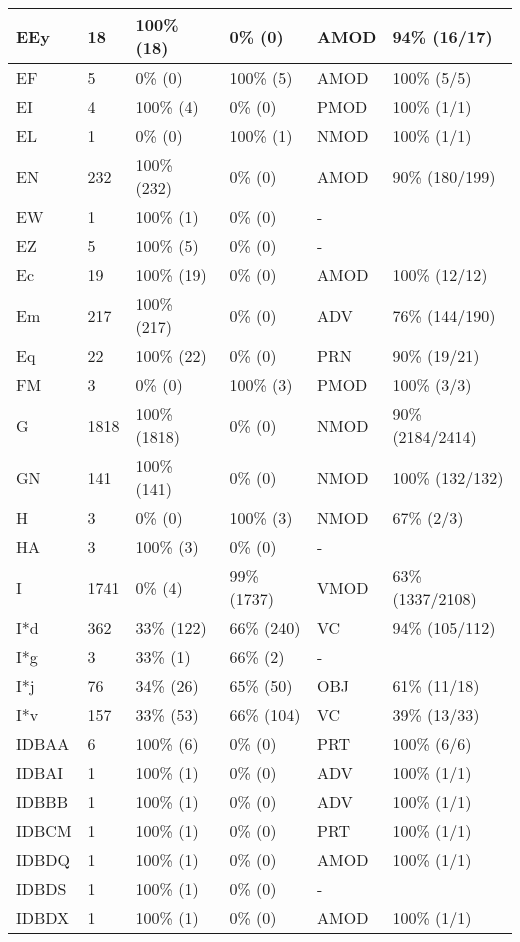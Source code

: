 \begin{figure*}
\begin{tabular}{|l|l|l|l||l|l|}
\hline
 EEy & 18 & 100\% (18) & 0\% (0) & AMOD & 94\% (16/17) \\ 
\hline
 EF & 5 & 0\% (0) & 100\% (5) & AMOD & 100\% (5/5) \\ 
\hline
 EI & 4 & 100\% (4) & 0\% (0) & PMOD & 100\% (1/1) \\ 
\hline
 EL & 1 & 0\% (0) & 100\% (1) & NMOD & 100\% (1/1) \\ 
\hline
 EN & 232 & 100\% (232) & 0\% (0) & AMOD & 90\% (180/199) \\ 
\hline
 EW & 1 & 100\% (1) & 0\% (0) & - &  \\ 
\hline
 EZ & 5 & 100\% (5) & 0\% (0) & - &  \\ 
\hline
 Ec & 19 & 100\% (19) & 0\% (0) & AMOD & 100\% (12/12) \\ 
\hline
 Em & 217 & 100\% (217) & 0\% (0) & ADV & 76\% (144/190) \\ 
\hline
 Eq & 22 & 100\% (22) & 0\% (0) & PRN & 90\% (19/21) \\ 
\hline
 FM & 3 & 0\% (0) & 100\% (3) & PMOD & 100\% (3/3) \\ 
\hline
 G & 1818 & 100\% (1818) & 0\% (0) & NMOD & 90\% (2184/2414) \\ 
\hline
 GN & 141 & 100\% (141) & 0\% (0) & NMOD & 100\% (132/132) \\ 
\hline
 H & 3 & 0\% (0) & 100\% (3) & NMOD & 67\% (2/3) \\ 
\hline
 HA & 3 & 100\% (3) & 0\% (0) & - &  \\ 
\hline
 I & 1741 & 0\% (4) & 99\% (1737) & VMOD & 63\% (1337/2108) \\ 
\hline
 I*d & 362 & 33\% (122) & 66\% (240) & VC & 94\% (105/112) \\ 
\hline
 I*g & 3 & 33\% (1) & 66\% (2) & - &  \\ 
\hline
 I*j & 76 & 34\% (26) & 65\% (50) & OBJ & 61\% (11/18) \\ 
\hline
 I*v & 157 & 33\% (53) & 66\% (104) & VC & 39\% (13/33) \\ 
\hline
 IDBAA & 6 & 100\% (6) & 0\% (0) & PRT & 100\% (6/6) \\ 
\hline
 IDBAI & 1 & 100\% (1) & 0\% (0) & ADV & 100\% (1/1) \\ 
\hline
 IDBBB & 1 & 100\% (1) & 0\% (0) & ADV & 100\% (1/1) \\ 
\hline
 IDBCM & 1 & 100\% (1) & 0\% (0) & PRT & 100\% (1/1) \\ 
\hline
 IDBDQ & 1 & 100\% (1) & 0\% (0) & AMOD & 100\% (1/1) \\ 
\hline
 IDBDS & 1 & 100\% (1) & 0\% (0) & - &  \\ 
\hline
 IDBDX & 1 & 100\% (1) & 0\% (0) & AMOD & 100\% (1/1) \\ 
\hline
\end{tabular}
\end{figure*}
